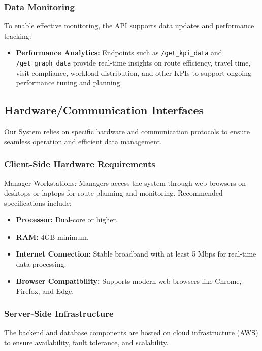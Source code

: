 \subsubsection{Data Monitoring}
To enable effective monitoring, the API supports data updates and performance tracking:

\begin{itemize}
    \item \textbf{Performance Analytics:} Endpoints such as \texttt{/get\_kpi\_data} and \texttt{/get\_graph\_data} provide real-time insights on route efficiency, travel time, visit compliance, workload distribution, and other KPIs to support ongoing performance tuning and planning.
\end{itemize}



\subsection{Hardware/Communication Interfaces}
Our System relies on specific hardware and communication protocols to ensure seamless operation and efficient data management.

\subsubsection{Client-Side Hardware Requirements}
Manager Workstations: Managers access the system through web browsers on desktops or laptops for route planning and monitoring. Recommended specifications include:
\begin{itemize}
    \item \textbf{Processor:} Dual-core or higher.
    \item \textbf{RAM:} 4GB minimum.
    \item \textbf{Internet Connection:} Stable broadband with at least 5 Mbps for real-time data processing.
    \item \textbf{Browser Compatibility:} Supports modern web browsers like Chrome, Firefox, and Edge.
\end{itemize}

\subsubsection{Server-Side Infrastructure}
The backend and database components are hosted on cloud infrastructure (AWS) to ensure availability, fault tolerance, and scalability.

